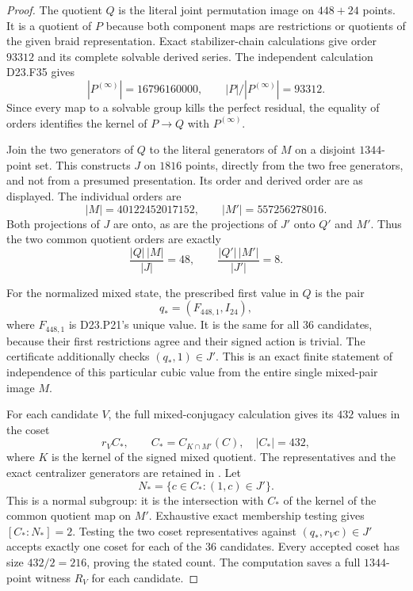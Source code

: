 \begin{proof}
The quotient $Q$ is the literal joint permutation image
on $448+24$ points. It is a quotient of $P$ because
both component maps are restrictions or quotients of
the given braid representation. Exact stabilizer-chain
calculations give order $93312$ and its complete
solvable derived series. The independent calculation
D23.F35 gives
\[
             |P^{(\infty)}|=16796160000,
 \qquad |P|/|P^{(\infty)}|=93312.
\]
Since every map to a solvable group kills the perfect
residual, the equality of orders identifies the kernel
of $P\to Q$ with $P^{(\infty)}$.

Join the two generators of $Q$ to the literal generators
of $M$ on a disjoint $1344$-point set. This constructs
$J$ on $1816$ points, directly from the two free
generators, and not from a presumed presentation.
Its order and derived order are as displayed. The
individual orders are
\[
 |M|=40122452017152,
 \qquad |M'|=557256278016.
\]
Both projections of $J$ are onto, as are the projections
of $J'$ onto $Q'$ and $M'$. Thus the two common quotient
orders are exactly
\[
          \frac{|Q|\,|M|}{|J|}=48,
 \qquad \frac{|Q'|\,|M'|}{|J'|}=8.
\]

For the normalized mixed state, the prescribed first
value in $Q$ is the pair
\[
                 q_*=(F_{448,1},I_{24}),
\]
where $F_{448,1}$ is D23.P21's unique value. It is the
same for all $36$ candidates, because their first
restrictions agree and their signed action is trivial.
The certificate additionally checks $(q_*,1)\in J'$.
This is an exact finite statement of independence of
this particular cubic value from the entire single
mixed-pair image $M$.

For each candidate $V$, the full mixed-conjugacy
calculation gives its $432$ values in the coset
\[
                      r_V C_*,\qquad
                  C_*=C_{K\cap M'}(C),\quad |C_*|=432,
\]
where $K$ is the kernel of the signed mixed quotient.
The representatives and the exact centralizer
generators are retained in
.
Let
\[
 N_* =\{c\in C_*:(1,c)\in J'\}.
\]
This is a normal subgroup: it is the intersection with
$C_*$ of the kernel of the common quotient map on $M'$.
Exhaustive exact membership testing gives
$[C_*:N_*]=2$. Testing the two coset representatives
against $(q_*,r_Vc)\in J'$ accepts exactly one coset
for each of the $36$ candidates. Every accepted coset
has size $432/2=216$, proving the stated count.
The computation saves a full $1344$-point witness $R_V$
for each candidate.


\end{proof}

